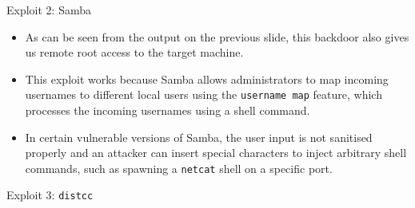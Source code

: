\documentclass[]{beamer}
\begin{document}
\begin{frame}{Exploit 2: Samba}
    \begin{itemize}
        \item   As can be seen from the output on the previous slide, this backdoor also gives us remote root access to the target machine.
        \item   This exploit works because Samba allows administrators to map incoming usernames to different local users using the \texttt{username map} feature, which processes the incoming usernames using a shell command.
        \item   In certain vulnerable versions of Samba, the user input is not sanitised properly and an attacker can insert special characters to inject arbitrary shell commands, such as spawning a \texttt{netcat} shell on a specific port.
    \end{itemize}
\end{frame}

\begin{frame}{Exploit 3: \texttt{distcc}}
    
\end{frame}
\end{document}
